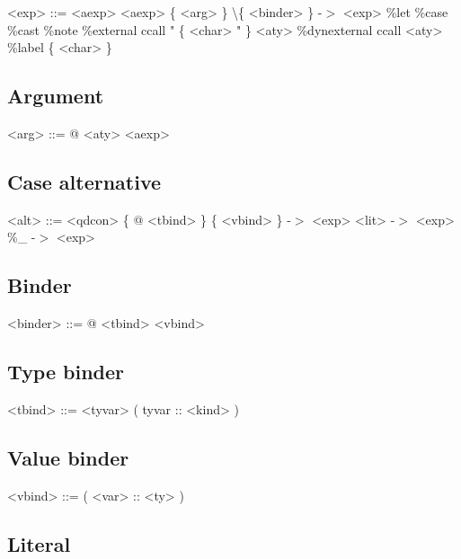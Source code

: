 \begin{grammar}
<exp> ::= <aexp>
     \alt <aexp> \{ <arg> \}
     \alt \textbackslash \{ <binder> \} -$>$ <exp>
     \alt \%let 
     \alt \%case
     \alt \%cast
     \alt \%note
     \alt \%external ccall " \{ <char> " \} <aty>
     \alt \%dynexternal ccall <aty>
     \alt \%label \{ <char> \}
\end{grammar}

\subsection{Argument}

\begin{grammar}
<arg> ::= @ <aty>
     \alt <aexp>
\end{grammar}

\subsection{Case alternative}

\begin{grammar}
<alt> ::= <qdcon> \{ @ <tbind> \} \{ <vbind> \} -$>$ <exp>
     \alt <lit> -$>$ <exp>
     \alt \%\_ -$>$ <exp>
\end{grammar}

\subsection{Binder}

\begin{grammar}
<binder> ::= @ <tbind>
        \alt <vbind>
\end{grammar}

\subsection{Type binder}

\begin{grammar}
<tbind> ::= <tyvar>
       \alt ( tyvar :: <kind> )
\end{grammar}

\subsection{Value binder}

\begin{grammar}
<vbind> ::= ( <var> :: <ty> )
\end{grammar}

\subsection{Literal}

